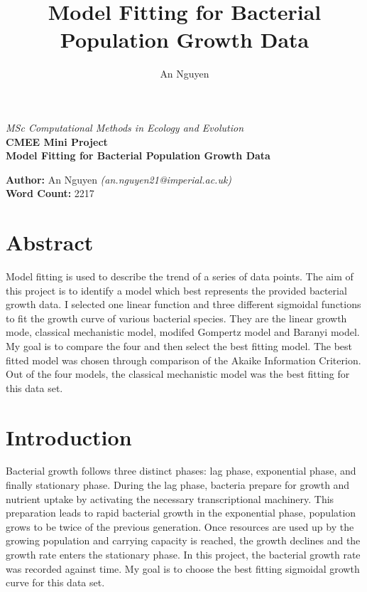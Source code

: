 \documentclass[11pt]{article}
\title{Model Fitting for Bacterial Population Growth Data}
\author{An Nguyen}
\begin{document}
\begin{titlepage}

        \centering
		\vspace*{2cm}
		\Large
		\emph{MSc Computational Methods in Ecology and Evolution}\\
		\vspace*{1cm}
		\Large
		\textbf{CMEE Mini Project}\\
		
		\vspace*{3cm}
		\Huge
		\textbf{Model Fitting for Bacterial Population Growth Data}\\
		
		\vspace{3cm}
		\Large
		
		\textbf{Author:} An Nguyen \textit{(an.nguyen21@imperial.ac.uk)}\\
		\vspace*{1cm}
		\textbf{Word Count:} 2217

	\end{titlepage}
\newpage
\tableofcontents
\newpage
{}
\section*{Abstract}
Model fitting is used to describe the trend of a series of data points.  The aim of this project is to identify a model which best represents the provided bacterial growth data. I selected one linear function and three different sigmoidal functions to fit the growth curve of various bacterial species. They are the linear growth mode, classical mechanistic model, modifed Gompertz model and Baranyi model. My goal is to compare the four and then select the best fitting model. The best fitted model was chosen through comparison of the Akaike Information Criterion. Out of the four models, the classical mechanistic model was the best fitting for this data set. 

\newpage
\section{Introduction}

Bacterial growth follows three distinct phases: lag phase, exponential phase, and finally stationary phase. During the lag phase, bacteria prepare for growth and nutrient uptake by activating the necessary transcriptional machinery. This preparation leads to rapid bacterial growth in the exponential phase, population grows to be twice of the previous generation. Once resources are used up by the growing population and carrying capacity is reached, the growth declines and the growth rate enters the stationary phase. In this project, the bacterial growth rate was recorded against time. My goal is to choose the best fitting sigmoidal growth curve for this data set. 
\end{document}
